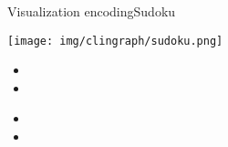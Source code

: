 \begin{frame}{Visualization encoding}{Sudoku}
  \centering
  \begin{minipage}{.3\textwidth}
    \texttt{[image: img/clingraph/sudoku.png]}
  \end{minipage}
  \begin{minipage}{.3\textwidth}
    \begin{itemize}
      \item {}
      \item {}
    \end{itemize}
  \end{minipage}
  \begin{minipage}{.3\textwidth}
    \begin{itemize}
      \item {}
      \item {}
    \end{itemize}
  \end{minipage}
  \pause
  \bigskip
  
\end{frame}
